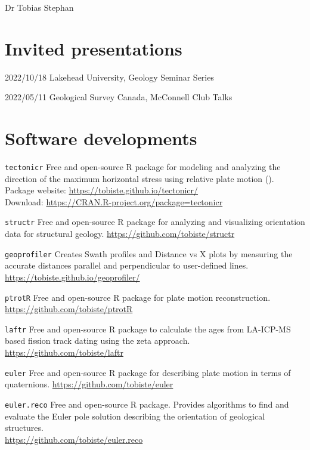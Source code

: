 \documentclass[10pt, paper=letter]{scrartcl} %
\begin{document}
\begin{cv}{\textsf{Dr Tobias Stephan}}
    \section{Invited presentations}
    \begin{cvlist}{}
        \item[2022/10/18]{Lakehead University, Geology Seminar Series}
        \item[2022/05/11]{Geological Survey Canada, McConnell Club Talks}
    \end{cvlist}

    \section{Software developments}
    \begin{cvlist}{}
        \item[\texttt{tectonicr}] Free and open-source R package for modeling and analyzing the direction of the maximum horizontal stress using relative plate motion ().\\
        Package website: \url{https://tobiste.github.io/tectonicr/}\\
        Download: \url{https://CRAN.R-project.org/package=tectonicr}
        \item[\texttt{structr}] Free and open-source R package for analyzing and visualizing orientation data for structural geology.
        \url{https://github.com/tobiste/structr}
        \item[\texttt{geoprofiler}] Creates Swath profiles and Distance vs X plots by measuring the accurate distances parallel and perpendicular to user-defined lines.\newline
        \url{https://tobiste.github.io/geoprofiler/}
        \item[\texttt{ptrotR}] Free and open-source R package for plate motion reconstruction.
        \url{https://github.com/tobiste/ptrotR}
        \item[\texttt{laftr}] Free and open-source R package to calculate the ages from LA-ICP-MS based fission track dating using the zeta approach.
        \url{https://github.com/tobiste/laftr}
        \item[\texttt{euler}] Free and open-source R package for describing plate motion in terms of quaternions.\newline
        \url{https://github.com/tobiste/euler}
        \item[\texttt{euler.reco}] Free and open-source R package. Provides algorithms to find and evaluate the Euler pole solution describing the orientation of geological structures.\\
        \url{https://github.com/tobiste/euler.reco}
    \end{cvlist}


\end{cv}
\end{document}
